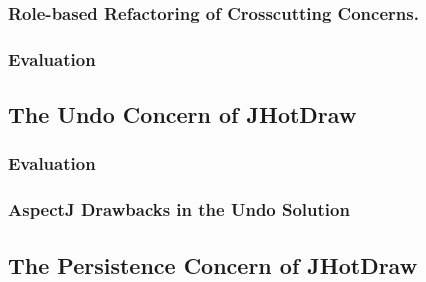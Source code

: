 \subsubsection{Role-based Refactoring of Crosscutting Concerns.}

\subsubsection{Evaluation}

\subsection{The Undo Concern of JHotDraw}

\subsubsection{Evaluation}

\subsubsection{AspectJ Drawbacks in the Undo Solution}

\subsection{The Persistence Concern of JHotDraw}
